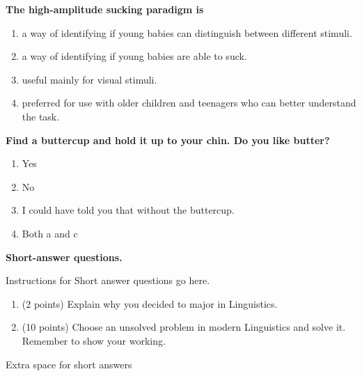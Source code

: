 \documentclass[12pt]{article}
\newcommand{\q}[1]{
\pagebreak[1]\begin{samepage}
\item \textbf{#1} \\
\nopagebreak
}
\newcommand{\ans}[1]{\item {#1}\hspace{2mm}}
\newcommand{\fixedans}[1]{\item {#1}\hspace{2mm}}
\newcommand{\balong}{

\begin{minipage}{1\linewidth}
\begin{enumerate}
}
\newcommand{\ealong}{
\end{enumerate}
\end{minipage}
\end{samepage}
\vspace{3mm}
\pagebreak[3]
}
\newenvironment{head}[1]%
{\large \textbf{#1}\begin{itshape}}%
{\end{itshape}\vspace{3mm}\normalsize}%
\begin{document}
\begin{multicols}{2}
\begin{enumerate}
\q{The high-amplitude sucking paradigm is}
\balong
\ans{a way of identifying if young babies can distinguish between different stimuli.}%
\ans{a way of identifying if young babies are able to suck.}
\ans{useful mainly for visual stimuli.}
\ans{preferred for use with older children and teenagers who can better understand the task.}
\ealong

\q{Find a buttercup and hold it up to your chin. Do you like butter?}
\balong
\fixedans{Yes}
\fixedans{No}
\fixedans{I could have told you that without the buttercup.}
\fixedans{Both a and c} %
\ealong




\end{enumerate}
\end{multicols}

\clearpage


\begin{head}{Short-answer questions.}
Instructions for Short answer questions go here.
\end{head}
\begin{enumerate}

\item (2 points) Explain why you decided to major in Linguistics.

\item (10 points) Choose an unsolved problem in modern Linguistics and solve it. Remember to show your working.

\end{enumerate}
\vspace{6ex}




\clearpage
\begin{center}
Extra space for short answers
\end{center}
\end{document}
